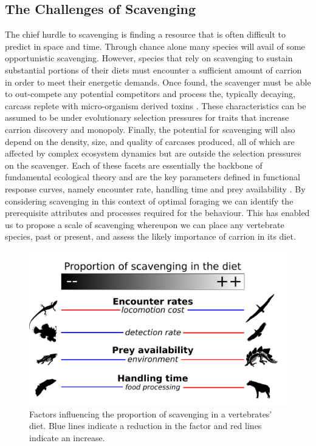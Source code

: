 \documentclass[a4paper,12pt]{article}
\begin{document}
\subsection*{The Challenges of Scavenging} 
The chief hurdle to scavenging is finding a resource that is often difficult to predict in space and time.
Through chance alone many species will avail of some opportunistic scavenging. 
However, species that rely on scavenging to sustain substantial portions of their diets must encounter a sufficient amount of carrion in order to meet their energetic demands.
Once found, the scavenger must be able to out-compete any potential competitors and process the, typically decaying, carcass replete with micro-organism derived toxins  \citep{ruxton2014fruit}. 
These characteristics can be assumed to be under evolutionary selection pressures for traits that increase carrion discovery and monopoly.
Finally, the potential for scavenging will also depend on the density, size, and quality of carcases produced, all of which are affected by complex ecosystem dynamics but are outside the selection pressures on the scavenger.
Each of these facets are essentially the backbone of fundamental ecological theory and are the key parameters defined in functional response curves, namely encounter rate, handling time and prey availability \citep{jeschke2002predator}.  
By considering scavenging in this context of optimal foraging we can identify the prerequisite attributes and processes required for the behaviour. 
This has enabled us to propose a scale of scavenging whereupon we can place any vertebrate species, past or present, and assess the likely importance of carrion in its diet. 

\begin{figure}[!htbp]
\centering
   \includegraphics[width=1\textwidth]{Summary_figure/Summary_figure_Landscape.pdf}
\caption{Factors influencing the proportion of scavenging in a vertebrates' diet. Blue lines indicate a reduction in the factor and red lines indicate an increase.}
\label{Summary_figure}
\end{figure}
\end{document}
